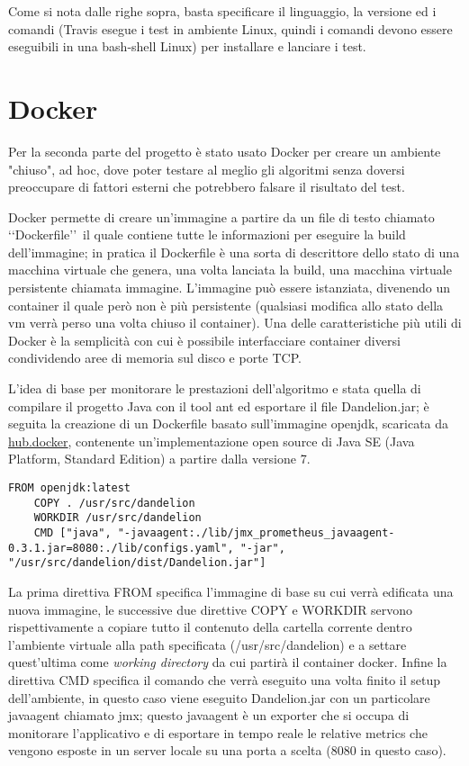 Come si nota dalle righe sopra, basta specificare il linguaggio, la versione ed i comandi (Travis esegue i test in ambiente Linux, quindi i comandi devono essere eseguibili in una bash-shell Linux) 
per installare e lanciare i test.

\section{Docker}
Per la seconda parte del progetto è stato usato Docker per creare un ambiente "chiuso", ad hoc, dove poter testare al meglio gli algoritmi senza doversi preoccupare di fattori esterni che potrebbero falsare 
il risultato del test. 

Docker permette di creare un'immagine a partire da un file di testo chiamato \lq\lq Dockerfile\rq\rq\ il quale contiene tutte le informazioni per eseguire la build dell'immagine; in pratica 
il Dockerfile è una sorta di descrittore dello stato di una macchina virtuale che genera, una volta lanciata la build, una macchina virtuale persistente chiamata immagine. L'immagine può essere istanziata, divenendo un container 
il quale però non è più persistente (qualsiasi modifica allo stato della vm verrà perso una volta chiuso il container). Una delle caratteristiche più utili di Docker è la semplicità con cui è possibile interfacciare container diversi condividendo aree di memoria sul disco e porte TCP.

L'idea di base per monitorare le prestazioni dell'algoritmo e stata quella di compilare il progetto Java con il tool ant ed esportare il file Dandelion.jar; è seguita la creazione di un Dockerfile basato sull'immagine openjdk, 
scaricata da \href{https://hub.docker.com/}{hub.docker}, contenente un'implementazione open source di Java SE (Java Platform, Standard Edition) a partire dalla versione 7. 

\begin{lstlisting}[style=YmlStyle]
    FROM openjdk:latest
    COPY . /usr/src/dandelion
    WORKDIR /usr/src/dandelion
    CMD ["java", "-javaagent:./lib/jmx_prometheus_javaagent-0.3.1.jar=8080:./lib/configs.yaml", "-jar", "/usr/src/dandelion/dist/Dandelion.jar"]
\end{lstlisting}

La prima direttiva FROM specifica l'immagine di base su cui verrà edificata una nuova immagine, le successive due direttive COPY e WORKDIR servono rispettivamente a copiare tutto il contenuto della cartella corrente 
dentro l'ambiente virtuale alla path specificata (/usr/src/dandelion) e a settare quest'ultima come \textit{working directory} da cui partirà il container docker. 
Infine la direttiva CMD specifica il comando che verrà eseguito una volta finito il setup dell'ambiente, in questo caso viene eseguito Dandelion.jar con un particolare javaagent chiamato jmx;
questo javaagent è un exporter che si occupa di monitorare l'applicativo e di esportare in tempo reale le relative metrics che vengono esposte in un server locale su una porta a scelta (8080 in questo caso).

